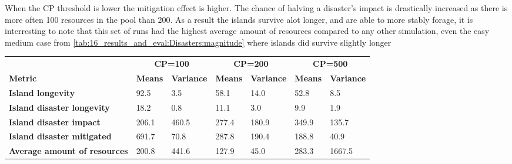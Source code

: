 When the CP threshold is lower the mitigation effect is higher. The chance of halving a disaster's impact is drastically increased as there is more often 100 resources in the pool than 200. As a result the islands survive alot longer, and are able to more stably forage, it is interresting to note that this set of runs had the highest average amount of resources compared to any other simulation, even the easy medium case from \ref{tab:16_results_and_eval:Disasters:magnitude}  where islands did survive slightly longer
\begin{center}
\begin{table}[h]
\begin{tabular}{l|ll|ll|ll}
                                     & \multicolumn{2}{c}{\textbf{CP=100}}                             & \multicolumn{2}{c}{\textbf{CP=200}}                               & \multicolumn{2}{c}{\textbf{CP=500}}                                        \\
\textbf{Metric}                      & \multicolumn{1}{c}{\textbf{Means}} & \multicolumn{1}{c}{\textbf{Variance}} & \multicolumn{1}{c}{\textbf{Means}} & \multicolumn{1}{c}{\textbf{Variance}} & \multicolumn{1}{c}{\textbf{Means}} & \multicolumn{1}{c}{\textbf{Variance}} \\ \hline
\textbf{Island longevity}            & 92.5                               & 3.5                                   & 58.1                               & 14.0                                  & 52.8                               & 8.5                                   \\
\textbf{Island disaster longevity}   & 18.2                               & 0.8                                   & 11.1                               & 3.0                                   & 9.9                                & 1.9                                   \\
\textbf{Island disaster impact}      & 206.1                              & 460.5                                 & 277.4                              & 180.9                                 & 349.9                              & 135.7                                 \\
\textbf{Island disaster mitigated}   & 691.7                              & 70.8                                  & 287.8                              & 190.4                                 & 188.8                              & 40.9                                  \\
\textbf{Average amount of resources} & 200.8                              & 441.6                                 & 127.9                              & 45.0                                  & 283.3                              & 1667.5                                \\

\end{tabular}
\end{table}
\end{center}
